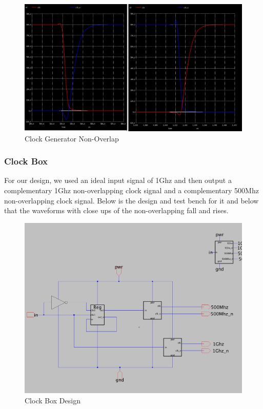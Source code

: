 \documentclass[a4paper]{article}
\begin{document}
\begin{figure}[H]
	\centering
	\includegraphics[scale=0.26]{clockGenOverlap}
	\caption{Clock Generator Non-Overlap}
	\label{fig:clockGenOverlap}
\end{figure}


\subsubsection{Clock Box}
\label{sec:clock_box_design}

For our design, we used an ideal input signal of 1Ghz and then output a complementary 1Ghz non-overlapping clock signal and a complementary 500Mhz non-overlapping clock signal. Below is the design and test bench for it and below that the waveforms with close ups of the non-overlapping fall and rises.

\begin{figure}[H]
	\centering
	\includegraphics[scale=0.26]{clockBox}
	\caption{Clock Box Design}
	\label{fig:clockBox}
\end{figure}
\end{document}
